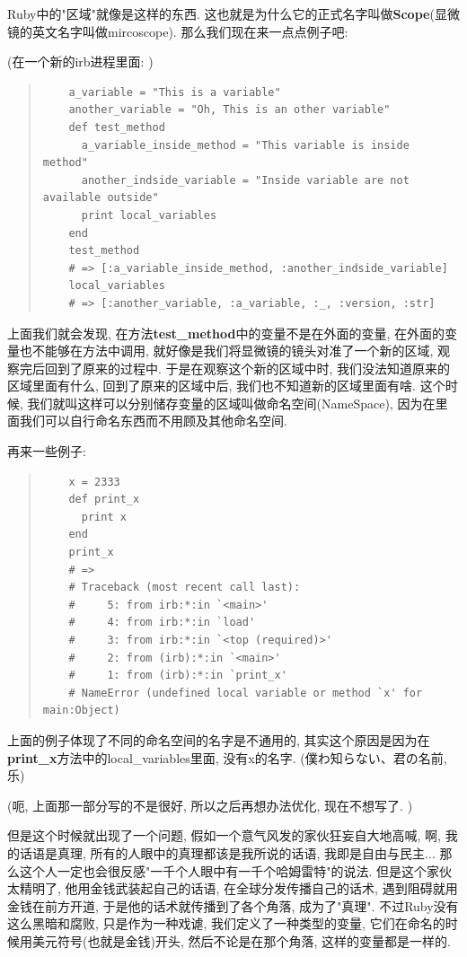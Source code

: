 Ruby中的"区域"就像是这样的东西. 这也就是为什么它的正式名字叫做\textbf{Scope}(显微镜的英文名字叫做mircoscope). 那么我们现在来一点点例子吧: 

(在一个新的irb进程里面: )

\begin{quotation}
  \begin{verbatim}
    a_variable = "This is a variable"
    another_variable = "Oh, This is an other variable"
    def test_method
      a_variable_inside_method = "This variable is inside method"
      another_indside_variable = "Inside variable are not available outside"
      print local_variables
    end
    test_method
    # => [:a_variable_inside_method, :another_indside_variable]
    local_variables
    # => [:another_variable, :a_variable, :_, :version, :str]
  \end{verbatim}
\end{quotation}

上面我们就会发现, 在方法\textbf{test\_method}中的变量不是在外面的变量, 在外面的变量也不能够在方法中调用, 就好像是我们将显微镜的镜头对准了一个新的区域, 观察完后回到了原来的过程中. 于是在观察这个新的区域中时, 我们没法知道原来的区域里面有什么, 回到了原来的区域中后, 我们也不知道新的区域里面有啥. 这个时候, 我们就叫这样可以分别储存变量的区域叫做命名空间(NameSpace), 因为在里面我们可以自行命名东西而不用顾及其他命名空间. 

再来一些例子: 

\begin{quotation}
  \begin{verbatim}
    x = 2333
    def print_x
      print x
    end
    print_x
    # => 
    # Traceback (most recent call last):
    #     5: from irb:*:in `<main>'
    #     4: from irb:*:in `load'
    #     3: from irb:*:in `<top (required)>'
    #     2: from (irb):*:in `<main>'
    #     1: from (irb):*:in `print_x'
    # NameError (undefined local variable or method `x' for main:Object)
  \end{verbatim}
\end{quotation}

上面的例子体现了不同的命名空间的名字是不通用的, 其实这个原因是因为在\textbf{print\_x}方法中的local\_variables里面, 没有x的名字. (僕わ知らない、君の名前, 乐)

(呃, 上面那一部分写的不是很好, 所以之后再想办法优化, 现在不想写了. )

但是这个时候就出现了一个问题, 假如一个意气风发的家伙狂妄自大地高喊, 啊, 我的话语是真理, 所有的人眼中的真理都该是我所说的话语, 我即是自由与民主... 那么这个人一定也会很反感"一千个人眼中有一千个哈姆雷特"的说法. 但是这个家伙太精明了, 他用金钱武装起自己的话语, 在全球分发传播自己的话术, 遇到阻碍就用金钱在前方开道, 于是他的话术就传播到了各个角落, 成为了"真理". 不过Ruby没有这么黑暗和腐败, 只是作为一种戏谑, 我们定义了一种类型的变量, 它们在命名的时候用美元符号(也就是金钱)开头, 然后不论是在那个角落, 这样的变量都是一样的. 

